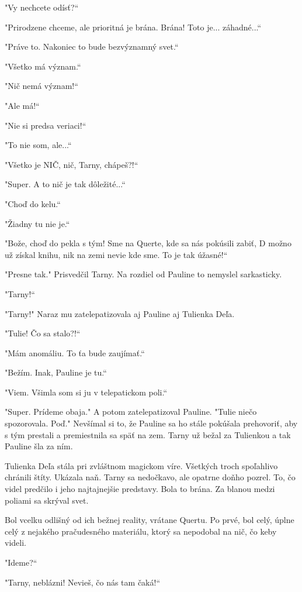 \documentclass{book}
\begin{document}
"$ $Vy nechcete odísť?“

"$ $Prirodzene chceme, ale prioritná je brána. Brána! Toto je... záhadné...“

"$ $Práve to. Nakoniec to bude bezvýznamný svet.“

"$ $Všetko má význam.“

"$ $Nič nemá význam!“

"$ $Ale má!“

"$ $Nie si predsa veriaci!“

"$ $To nie som, ale...“

"$ $Všetko je NIČ, nič, Tarny, chápeš?!“

"$ $Super. A to nič je tak dôležité...“

"$ $Choď do kelu.“

"$ $Žiadny tu nie je.“

"$ $Bože, choď do pekla s tým! Sme na Querte, kde sa nás pokúsili zabiť, D možno už získal knihu, nik na zemi nevie kde sme. To je tak úžasné!“

"$ $Presne tak."$ $ Prisvedčil Tarny. Na rozdiel od Pauline to nemyslel sarkasticky.

"$ $Tarny!“

"$ $Tarny!"$ $ Naraz mu zatelepatizovala aj Pauline aj Tulienka Deľa.

"$ $Tulie! Čo sa stalo?!“

"$ $Mám anomáliu. To ťa bude zaujímať.“

"$ $Bežím. Inak, Pauline je tu.“

"$ $Viem. Všimla som si ju v telepatickom poli.“

"$ $Super. Prídeme obaja."$ $ A potom zatelepatizoval Pauline. "$ $Tulie niečo spozorovala. Poď."$ $ Nevšímal si to, že Pauline sa ho stále pokúšala prehovoriť, aby s tým prestali a premiestnila sa späť na zem. Tarny už bežal za Tulienkou a tak Pauline šla za ním.

Tulienka Deľa stála pri zvláštnom magickom víre. Všetkých troch spoľahlivo chránili štíty. Ukázala naň. Tarny sa nedočkavo, ale opatrne doňho pozrel. To, čo videl predčilo i jeho najtajnejšie predstavy. Bola to brána. Za blanou medzi poliami sa skrýval svet.

Bol vcelku odlišný od ich bežnej reality, vrátane Quertu. Po prvé, bol celý, úplne celý z nejakého pračudesného materiálu, ktorý sa nepodobal na nič, čo keby videli.

"$ $Ideme?“

"$ $Tarny, neblázni! Nevieš, čo nás tam čaká!“
\end{document}

